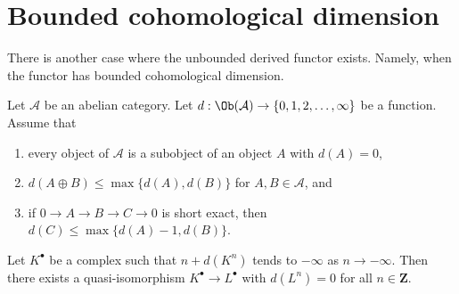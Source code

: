 \section{Bounded cohomological dimension}
\label{section-bounded}

\noindent
There is another case where the unbounded derived functor exists.
Namely, when the functor has bounded cohomological dimension.

\begin{lemma}
\label{lemma-replace-resolution}
Let $\mathcal{A}$ be an abelian category. Let
$d : \Ob(\mathcal{A}) \to \{0, 1, 2, \ldots, \infty\}$ be a function.
Assume that
\begin{enumerate}
\item every object of $\mathcal{A}$ is a subobject of an
object $A$ with $d(A) = 0$,
\item $d(A \oplus B) \leq \max \{d(A), d(B)\}$ for $A, B \in \mathcal{A}$, and
\item if $0 \to A \to B \to C \to 0$ is short exact, then
$d(C) \leq \max\{d(A) - 1, d(B)\}$.
\end{enumerate}
Let $K^\bullet$ be a complex such that $n + d(K^n)$ tends to $-\infty$
as $n \to -\infty$. Then there exists a quasi-isomorphism
$K^\bullet \to L^\bullet$ with $d(L^n) = 0$ for all $n \in \mathbf{Z}$.
\end{lemma}

